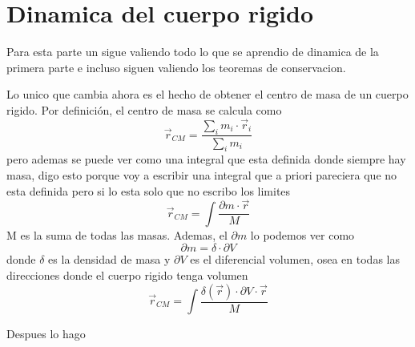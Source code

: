 \documentclass[../Main.tex]{subfiles}
\begin{document}
\npage{
}
{
    \section{Dinamica del cuerpo rigido}

    Para esta parte un sigue valiendo todo lo que se aprendio de dinamica de la
    primera parte e incluso siguen valiendo los teoremas de conservacion.

    Lo unico que cambia ahora es el hecho de obtener el centro de masa de un
    cuerpo rigido. Por definición, el centro de masa se calcula como
    \begin{equation*}
        \vec{r}_{CM} = \frac{\sum_i m_i \cdot \vec{r}_i}{\sum_i m_i}
    \end{equation*}
    pero ademas se puede ver como una integral que esta definida donde siempre
    hay masa, digo esto porque voy a escribir una integral que a priori pareciera 
    que no esta definida pero si lo esta solo que no escribo los limites
    \begin{equation*}
        \vec{r}_{CM} = \int \frac{ \partial m \cdot \vec{r}}{M}
    \end{equation*}
    M es la suma de todas las masas. Ademas, el $\partial m$ lo podemos ver como
    \begin{equation*}
        \partial m = \delta \cdot \partial V
    \end{equation*}
    donde $\delta$ es la densidad de masa y $\partial V$ es el diferencial volumen,
    osea en todas las direcciones donde el cuerpo rigido tenga volumen
    \begin{equation*}
        \vec{r}_{CM} = \int \frac{ \delta \left( \vec{r} \right) \cdot \partial V \cdot \vec{r}}{M}
    \end{equation*}


    Despues lo hago


}
\end{document}
